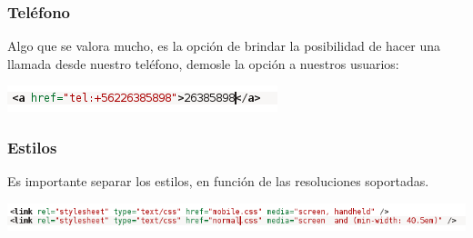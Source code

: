 \documentclass[12pt]{beamer}
\begin{document}
\begin{frame}
 \frametitle{Teléfono}
 Algo que se valora mucho, es la opción de brindar la posibilidad de hacer una llamada desde nuestro teléfono, demosle la opción a nuestros usuarios:
 \begin{center}
    \includegraphics[scale=1]{img/tel.png}
 \end{center}
\end{frame}


\begin{frame}
 \frametitle{Estilos}
 Es importante separar los estilos, en función de las resoluciones soportadas.
 \begin{center}
    \includegraphics[scale=0.5]{img/estilo.png}
 \end{center}
\end{frame}



\end{document}
